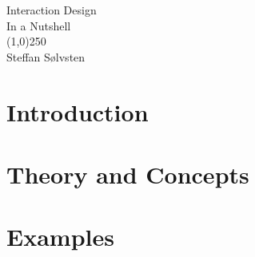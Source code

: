 \documentclass[a4, english, twoside]{article}
\begin{document}

\thispagestyle{empty} %
\begin{center}
	\phantom{}\vspace{3.1cm}
	{\Huge\sc Interaction Design}
	\\ \vspace{1em}
	{\LARGE\sc In a Nutshell}
	\\
	\line(1,0){250}
	\\ \vspace{1em}
	{\LARGE Steffan Sølvsten}
\end{center}

\BgThispage

\newpage
\thispagestyle{empty} %
\tableofcontents

\newpage
\section{Introduction}
\label{sec:introduction}



\newpage
\setcounter{page}{1}

\section{Theory and Concepts}
\label{sec:1}









\newpage
\section{Examples}
\label{sec:2}


\end{document}
